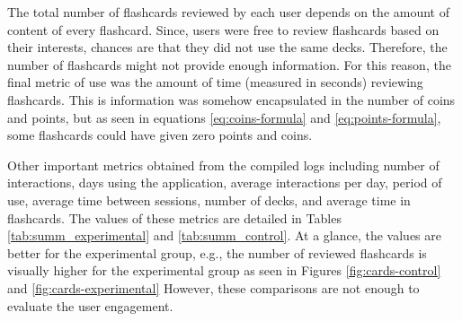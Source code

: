 The total number of flashcards reviewed by each user depends on the amount of content of every flashcard. Since, users were free to review flashcards based on their interests, chances are that they did not use the same decks. Therefore, the number of flashcards might not provide enough information. For this reason, the final metric of use was the amount of time (measured in seconds) reviewing flashcards. This is information was somehow encapsulated in the number of coins and points, but as seen in equations \ref{eq:coins-formula} and \ref{eq:points-formula}, some flashcards could have given zero points and coins.

Other important metrics obtained from the compiled logs including number of interactions, days using the application, average interactions per day, period of use, average time between sessions, number of decks, and average time in flashcards. The values of these metrics are detailed in Tables \ref{tab:summ_experimental} and \ref{tab:summ_control}. At a glance, the values are better for the experimental group, e.g., the number of reviewed flashcards is visually higher for the experimental group as seen in Figures \ref{fig:cards-control} and \ref{fig:cards-experimental} However, these comparisons are not enough to evaluate the user engagement.

